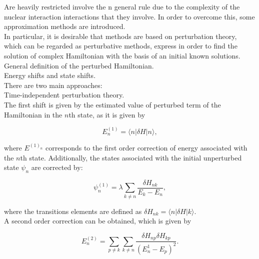 \documentclass[openany]{book}
\begin{document}
Are heavily restricted  involve the n  general rule due to the complexity of the nuclear interaction interactions that they involve. In order to overcome this, some approximation methods are introduced. \\

In particular, it is desirable that methods are based on perturbation theory, which can be regarded as perturbative methods, express   in order to find the solution of complex Hamiltonian with the basis of an initial known solutions. \\

General definition of the perturbed Hamiltonian. \\

Energy shifts and state shifts. \\

There are two main approaches:  \\

Time-independent perturbation theory.\\

The first shift is given by the estimated value of perturbed term of the Hamiltonian in the $n$th state, as it is given by 

\begin{equation} \label{eq:perturbationTheory_timeIndependent_E1}
	E^{(1)}_n = \langle  n |\delta H| n \rangle,
\end{equation}

where $E^{(1)_n}$ corresponds to the first order correction of energy associated with the $n$th state. Additionally, the states associated with the initial unperturbed state $\psi_n$ are corrected by:

\begin{equation} \label{eq:perturbationTheory_timeIndependent_psi1}
	\psi^{(1)}_n = \lambda \sum_{k \neq n}{\frac{\delta H_{nk}}{E_k - E_n}},
\end{equation}

where the transitions elements are defined as $\delta H_{nk} = \langle n |  \delta H | k \rangle $. \\

A second order correction can be obtained, which is given by 

\begin{equation} \label{eq:perturbationTheory_timeIndependent_E2}
	E^{(2)}_n = \sum_{p \neq k} \sum_{k \neq n} {\frac{\delta H_{np}\delta H_{kp} }{(E^{1}_n - E_p)^2}}.
\end{equation}
\end{document}
